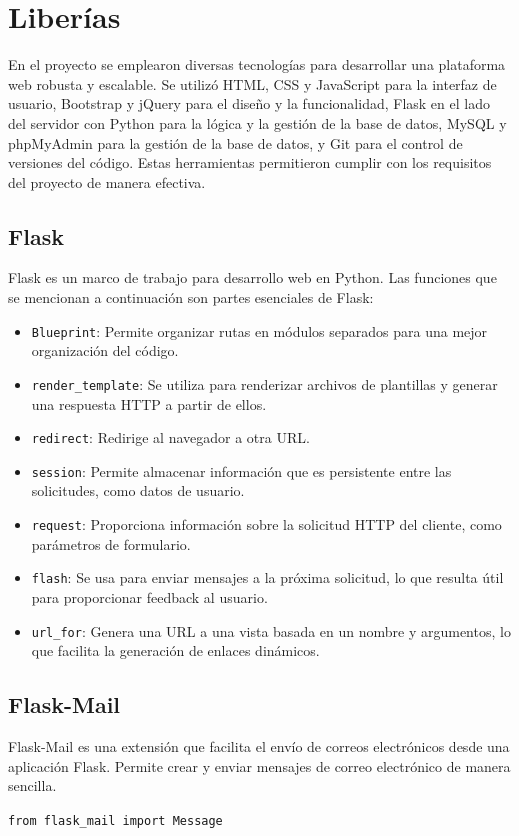 \documentclass[a4paper, 12pt]{book}
\begin{document}
\section{Liberías}
\label{sec:Librerias}

En el proyecto se emplearon diversas tecnologías para desarrollar una plataforma web robusta y escalable. Se utilizó HTML, CSS y JavaScript para la interfaz de usuario, Bootstrap y jQuery para el diseño y la funcionalidad, Flask en el lado del servidor con Python para la lógica y la gestión de la base de datos, MySQL y phpMyAdmin para la gestión de la base de datos, y Git para el control de versiones del código. Estas herramientas permitieron cumplir con los requisitos del proyecto de manera efectiva.
\subsection{Flask} 
Flask \cite{flaskbook} es un marco de trabajo para desarrollo web en Python. Las funciones que se mencionan a continuación son partes esenciales de Flask:

\begin{itemize}
  \item \texttt{Blueprint}: Permite organizar rutas en módulos separados para una mejor organización del código.
  \item \texttt{render\_template}: Se utiliza para renderizar archivos de plantillas y generar una respuesta HTTP a partir de ellos.
  \item \texttt{redirect}: Redirige al navegador a otra URL.
  \item \texttt{session}: Permite almacenar información que es persistente entre las solicitudes, como datos de usuario.
  \item \texttt{request}: Proporciona información sobre la solicitud HTTP del cliente, como parámetros de formulario.
  \item \texttt{flash}: Se usa para enviar mensajes a la próxima solicitud, lo que resulta útil para proporcionar feedback al usuario.
  \item \texttt{url\_for}: Genera una URL a una vista basada en un nombre y argumentos, lo que facilita la generación de enlaces dinámicos.
\end{itemize}

\subsection{Flask-Mail}
Flask-Mail es una extensión que facilita el envío de correos electrónicos desde una aplicación Flask. Permite crear y enviar mensajes de correo electrónico de manera sencilla.
\begin{center}
  \texttt{from flask\_mail import Message}
\end{center}
\end{document}
